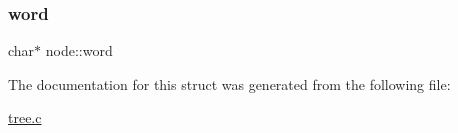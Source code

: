 \mbox{\label{structnode_a13405da913d6af4193e14b60b8364d4d}} 
\subsubsection{\texorpdfstring{word}{word}}
{\footnotesize\ttfamily char$\ast$ node\+::word}



The documentation for this struct was generated from the following file\+:\begin{DoxyCompactItemize}
\item 
\hyperlink{tree_8c}{tree.\+c}\end{DoxyCompactItemize}
